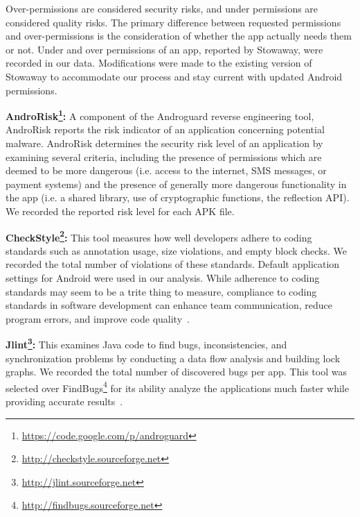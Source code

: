 \documentclass{sig-alternate-05-2015}
\begin{document}
Over-permissions are considered security risks, and under permissions are considered quality risks. The primary difference between requested permissions and over-permissions is the consideration of whether the app actually needs them or not. Under and over permissions of an app, reported by Stowaway, were recorded in our data. Modifications were made to the existing version of Stowaway to accommodate our process and stay current with updated Android permissions.





 \textbf{AndroRisk\footnote{\url{https://code.google.com/p/androguard}}:} A component of the Androguard reverse engineering tool, AndroRisk reports the risk indicator of an application concerning potential malware. AndroRisk determines the security risk level of an application by examining several criteria, including the presence of permissions which are deemed to be more dangerous (i.e. access to the internet, SMS messages, or payment systems) and the presence of generally more dangerous functionality in the app (i.e. a shared library, use of cryptographic functions, the reflection API). We recorded the reported risk level for each APK file.


 \textbf{CheckStyle\footnote{\url{http://checkstyle.sourceforge.net}}:} This tool measures how well developers adhere to coding standards such as annotation usage, size violations, and empty block checks. We recorded the total number of violations of these standards. Default application settings for Android were used in our analysis. While adherence to coding standards may seem to be a trite thing to measure, compliance to coding standards in software development can enhance team communication, reduce program errors, and improve code quality~\cite{Li:2005:ETC:1095714.1095770}.

 \textbf{Jlint\footnote{\url{http://jlint.sourceforge.net}}:} This examines Java code to find bugs, inconsistencies, and synchronization problems by conducting a data flow analysis and building lock graphs. We recorded the total number of discovered bugs per app. This tool was selected over FindBugs\footnote{\url{http://findbugs.sourceforge.net}} for its ability analyze the applications much faster while providing accurate results~\cite{rutar2004comparison}.
\end{document}
